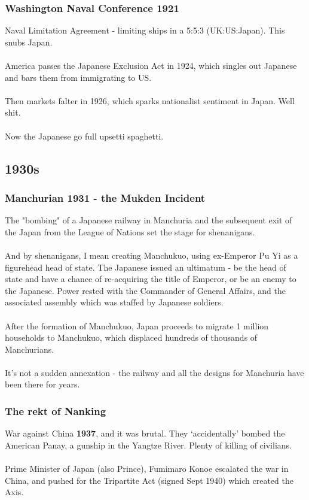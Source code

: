 \documentclass[a4paper]{article}
\begin{document}
\subsubsection{Washington Naval Conference 1921}
Naval Limitation Agreement - limiting ships in a 5:5:3 (UK:US:Japan). This snubs Japan.\\
\\
America passes the Japanese Exclusion Act in 1924, which singles out Japanese and bars them from immigrating to US.\\
\\
Then markets falter in 1926, which sparks nationalist sentiment in Japan. Well shit.\\
\\
Now the Japanese go full upsetti spaghetti.
\subsection{1930s}
\subsubsection{Manchurian 1931 - the Mukden Incident}
The "bombing" of a Japanese railway in Manchuria and the subsequent exit of the Japan from the League of Nations set the stage for shenanigans.\\
\\
And by shenanigans, I mean creating Manchukuo, using ex-Emperor Pu Yi as a figurehead head of state. The Japanese issued an ultimatum - be the head of state and have a chance of re-acquiring the title of Emperor, or be an enemy to the Japanese. Power rested with the Commander of General Affairs, and the associated assembly which was staffed by Japanese soldiers.\\
\\
After the formation of Manchukuo, Japan proceeds to migrate 1 million households to Manchukuo, which displaced hundreds of thousands of Manchurians.\\
\\
It's not a sudden annexation - the railway and all the designs for Manchuria have been there for years.
\subsubsection{The rekt of Nanking}
War against China \textbf{1937}, and it was brutal. They `accidentally' bombed the American Panay, a gunship in the Yangtze River. Plenty of killing of civilians.\\
\\
Prime Minister of Japan (also Prince), Fumimaro Konoe escalated the war in China, and pushed for the Tripartite Act (signed Sept 1940) which created the Axis.
\end{document}
